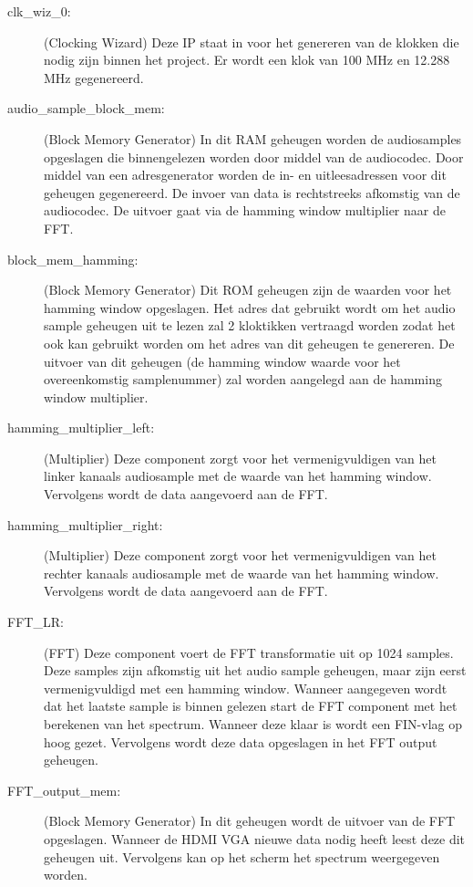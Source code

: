 	\begin{description}
		\item[clk\_wiz\_0:] (Clocking Wizard) Deze IP staat in voor het genereren van de klokken die nodig zijn binnen het project. Er wordt een klok van 100 MHz en 12.288 MHz gegenereerd. 
		
		\item[audio\_sample\_block\_mem:] (Block Memory Generator) In dit RAM geheugen worden de audiosamples opgeslagen die binnengelezen worden door middel van de audiocodec. Door middel van een adresgenerator worden de in- en uitleesadressen voor dit geheugen gegenereerd. De invoer van data is rechtstreeks afkomstig van de audiocodec. De uitvoer gaat via de hamming window multiplier naar de FFT.  
		
		\item[block\_mem\_hamming:] (Block Memory Generator) Dit ROM geheugen zijn de waarden voor het hamming window opgeslagen. Het adres dat gebruikt wordt om het audio sample geheugen uit te lezen zal 2 kloktikken vertraagd worden zodat het ook kan gebruikt worden om het adres van dit geheugen te genereren. De uitvoer van dit geheugen (de hamming window waarde voor het overeenkomstig samplenummer) zal worden aangelegd aan de hamming window multiplier.
		
		\item[hamming\_multiplier\_left:] (Multiplier) Deze component zorgt voor het vermenigvuldigen van het linker kanaals audiosample met de waarde van het hamming window. Vervolgens wordt de data aangevoerd aan de FFT.
		
		\item[hamming\_multiplier\_right:] (Multiplier) Deze component zorgt voor het vermenigvuldigen van het rechter kanaals audiosample met de waarde van het hamming window. Vervolgens wordt de data aangevoerd aan de FFT.
		
		\item[FFT\_LR:] (FFT) Deze component voert de FFT transformatie uit op 1024 samples. Deze samples zijn afkomstig uit het audio sample geheugen, maar zijn eerst vermenigvuldigd met een hamming window. Wanneer aangegeven wordt dat het laatste sample is binnen gelezen start de FFT component met het berekenen van het spectrum. Wanneer deze klaar is wordt een FIN-vlag op hoog gezet. Vervolgens wordt deze data opgeslagen in het FFT output geheugen.
		
		\item[FFT\_output\_mem:] (Block Memory Generator)  In dit geheugen wordt de uitvoer van de FFT opgeslagen. Wanneer de HDMI VGA nieuwe data nodig heeft leest deze dit geheugen uit. Vervolgens kan op het scherm het spectrum weergegeven worden.
	\end{description}


